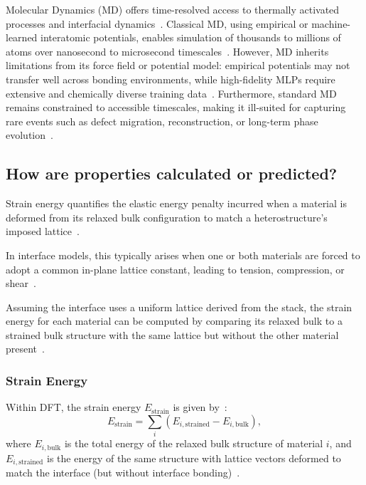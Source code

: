 Molecular Dynamics (MD) offers time-resolved access to thermally activated processes and interfacial dynamics~\nocite{}.
Classical MD, using empirical or machine-learned interatomic potentials, enables simulation of thousands to millions of atoms over nanosecond to microsecond timescales~\cite{Khot2025-hh, Batzner2022-fd, Schutt2018-xc}.
However, MD inherits limitations from its force field or potential model: empirical potentials may not transfer well across bonding environments, while high-fidelity MLPs require extensive and chemically diverse training data~\nocite{}.
Furthermore, standard MD remains constrained to accessible timescales, making it ill-suited for capturing rare events such as defect migration, reconstruction, or long-term phase evolution~\cite{Khot2025-hh}.

\subsection*{How are properties calculated or predicted?}

Strain energy quantifies the elastic energy penalty incurred when a material is deformed from its relaxed bulk configuration to match a heterostructure's imposed lattice~\nocite{}.

\newpage In interface models, this typically arises when one or both materials are forced to adopt a common in-plane lattice constant, leading to tension, compression, or shear~\nocite{}.

Assuming the interface uses a uniform lattice derived from the stack, the strain energy for each material can be computed by comparing its relaxed bulk to a strained bulk structure with the same lattice but without the other material present~\nocite{}.

\subsubsection*{Strain Energy}

Within DFT, the strain energy $E_\mathrm{strain}$ is given by~\nocite{}:
\begin{equation}
        E_\mathrm{strain} = \sum_i \left( E_{i,\mathrm{strained}} - E_{i,\mathrm{bulk}} \right),
\end{equation}
where $E_{i,\mathrm{bulk}}$ is the total energy of the relaxed bulk structure of material $i$, and $E_{i,\mathrm{strained}}$ is the energy of the same structure with lattice vectors deformed to match the interface (but without interface bonding)~\nocite{}.


